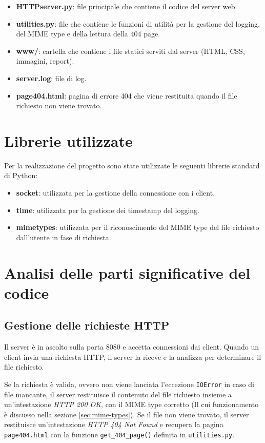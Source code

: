 \documentclass[a4paper,12pt]{report}
\begin{document}
\begin{itemize}
  \item \textbf{HTTPserver.py}: file principale che contiene il codice del server web.
  \item \textbf{utilities.py}: file che contiene le funzioni di utilità per la gestione del logging, del MIME type e della lettura della 404 page.
  \item \textbf{www/}: cartella che contiene i file statici serviti dal server (HTML, CSS, immagini, report).
  \item \textbf{server.log}: file di log.
  \item \textbf{page404.html}: pagina di errore 404 che viene restituita quando il file richiesto non viene trovato.
\end{itemize}

\section{Librerie utilizzate}
Per la realizzazione del progetto sono state utilizzate le seguenti librerie standard di Python:
\begin{itemize}
    \item \textbf{socket}: utilizzata per la gestione della connessione con i client.
    \item \textbf{time}: utilizzata per la gestione dei timestamp del logging.
    \item \textbf{mimetypes}: utilizzata per il riconoscimento del MIME type del file richiesto dall'utente in fase di richiesta.
\end{itemize}

\section{Analisi delle parti significative del codice}
\subsection{Gestione delle richieste HTTP}
\label{sec:gestione-richieste-http}
Il server è in ascolto sulla porta 8080 e accetta connessioni dai client. Quando un client invia una richiesta HTTP, il server la riceve e la analizza per determinare il file richiesto.

Se la richiesta è valida, ovvero non viene lanciata l'eccezione \texttt{IOError} in caso di file mancante, il server restituisce il contenuto del file richiesto insieme a un'intestazione \textit{HTTP 200 OK}, con il MIME type corretto (Il cui funzionamento è discusso nella sezione \ref{sec:mime-types}). Se il file non viene trovato, il server restituisce un'intestazione \textit{HTTP 404 Not Found} e recupera la pagina \texttt{page404.html} con la funzione \texttt{get\_404\_page()} definita in \texttt{utilities.py}.
\end{document}
